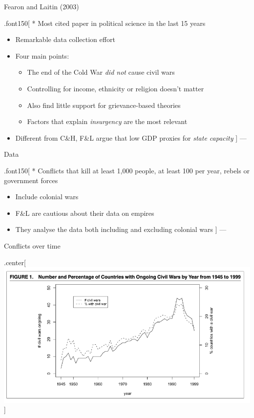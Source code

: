 \documentclass[ignorenonframetext,]{beamer}
\providecommand{\tightlist}{%
  \setlength{\itemsep}{0pt}\setlength{\parskip}{0pt}}
\begin{document}
\begin{frame}{Fearon and Laitin (2003)}

.font150{[} * Most cited paper in political science in the last 15 years

\begin{itemize}
\item
  Remarkable data collection effort
\item
  Four main points:

  \begin{itemize}
  \tightlist
  \item
    The end of the Cold War \emph{did not} cause civil wars
  \item
    Controlling for income, ethnicity or religion doesn't matter
  \item
    Also find little support for grievance-based theories
  \item
    Factors that explain \emph{insurgency} are the most relevant
  \end{itemize}
\item
  Different from C\&H, F\&L argue that low GDP proxies for \emph{state
  capacity} {]} ---
\end{itemize}

\end{frame}

\begin{frame}{Data}

.font150{[} * Conflicts that kill at least 1,000 people, at least 100
per year, rebels or government forces

\begin{itemize}
\item
  Include colonial wars
\item
  F\&L are cautious about their data on empires
\item
  They analyse the data both including and excluding colonial wars {]}
  ---
\end{itemize}

\end{frame}

\begin{frame}{Conflicts over time}

\begin{block}{.center{[}\includegraphics{fearon01.png}{]}}

\end{block}

\end{frame}
\end{document}
